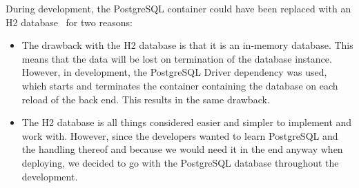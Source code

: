 During development, the PostgreSQL container could have been replaced with
an H2
database~\cite{h22024} for two reasons:

\begin{itemize}
    \item The drawback with the
    H2
    database is that it is an in-memory database.
    This means that the data will be lost on termination of the database instance.
    However, in development, the PostgreSQL Driver dependency was used, which starts and terminates the container
    containing the database on each reload of the back end.
    This results in the same drawback.
    \item The
    H2
    database is all things considered easier and simpler to implement and work with.
    However, since the developers wanted to learn PostgreSQL and the handling thereof and because we would
    need it in the end anyway when deploying, we decided to go with the PostgreSQL database throughout the development.
\end{itemize}
